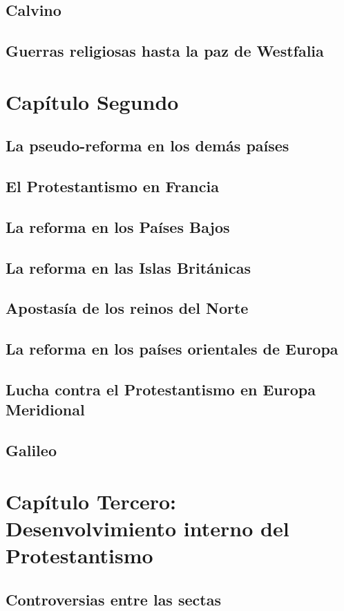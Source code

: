 \raggedbottom{} \documentclass[12pt, a4paper]{book}
\begin{document}
\section{Calvino}
\section{Guerras religiosas hasta la paz de Westfalia}
\chapter{Capítulo Segundo}
\section{La pseudo-reforma en los demás países}
\section{El Protestantismo en Francia}
\section{La reforma en los Países Bajos}
\section{La reforma en las Islas Británicas}
\section{Apostasía de los reinos del Norte}
\section{La reforma en los países orientales de Europa}
\section{Lucha contra el Protestantismo en Europa Meridional}
\section{Galileo}
\chapter{Capítulo Tercero: Desenvolvimiento interno del Protestantismo}
\section{Controversias entre las sectas}
\end{document}
